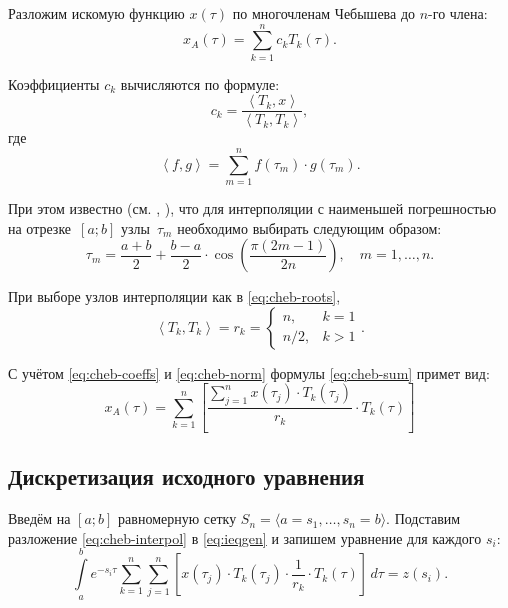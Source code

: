\documentclass[11pt]{article}
\numberwithin{equation}{section}
\newcommand{\intl}{\int\limits}
\newcommand{\scalmult}[1]{{\left \langle #1 \right \rangle}}
\newcommand{\mul}{\cdot}
\begin{document}
Разложим искомую функцию $x(\tau)$ по многочленам Чебышева до $n$-го члена:
\begin{equation}
  \label{eq:cheb-sum}
  x_A(\tau) = \sum_{k=1}^n{c_k T_k(\tau)}.
\end{equation}

Коэффициенты $c_k$ вычисляются по формуле:
\begin{equation}
  \label{eq:cheb-coeffs}
  c_k = \frac{\scalmult{T_k, x}}{\scalmult{T_k, T_k}},
\end{equation}
где
\begin{equation}
  \label{eq:discrete-scalmult}
  \scalmult{f, g} = \sum_{m=1}^n{f(\tau_m)\mul g(\tau_m)}.
\end{equation}

При этом известно (см. \cite{bahvalov01}, \cite{amosov94}), что для
интерполяции с наименьшей погрешностью на отрезке $[a;b]$ узлы $\tau_m$
необходимо выбирать следующим образом:
\begin{equation}
  \label{eq:cheb-roots}
  \tau_m = \frac{a+b}{2} +
  \frac{b-a}{2}\mul\cos\left(\frac{\pi(2m-1)}{2n}\right),\quad m = 1,\ldots,n.
\end{equation}

При выборе узлов интерполяции как в \eqref{eq:cheb-roots},
\begin{equation}
  \label{eq:cheb-norm}
  \scalmult{T_k, T_k} = r_k =
  \begin{cases}
    n,&k = 1\\
    n/2,&k>1
  \end{cases}.
\end{equation}

С учётом \eqref{eq:cheb-coeffs} и \eqref{eq:cheb-norm} формулы
\eqref{eq:cheb-sum} примет вид:
\begin{equation}
  \label{eq:cheb-interpol}
  x_A(\tau) = \sum_{k=1}^n \left[
    \frac{\sum_{j=1}^n 
      x(\tau_j)\mul T_k(\tau_j)}{r_k}
    \mul T_k(\tau)
  \right]
\end{equation}

\subsection{Дискретизация исходного уравнения}
Введём на $[a; b]$ равномерную сетку $S_n = \langle a = s_1, \dotsc,
s_n = b \rangle$. Подставим разложение \eqref{eq:cheb-interpol} в
\eqref{eq:ieqgen} и запишем уравнение для каждого $s_i$:
\begin{equation}
  \label{eq:psi-matrix}
  \intl_a^b
  e^{-s_i\tau}
  \sum_{k=1}^n\sum_{j=1}^n \left[
    x(\tau_j)\mul T_k(\tau_j) \mul \frac{1}{r_k} \mul T_k(\tau)
  \right]\,d\tau = 
  z(s_i).
\end{equation}
\end{document}

